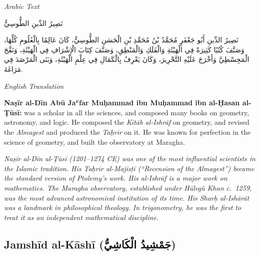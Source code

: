 \documentclass[11pt,a4paper]{article}
\def\RL#1{\beginR#1\endR}
\newcommand{\cnote}[1]{\textcolor{notecolor}{\textit{#1}}}
\newcommand{\textarabic}[1]{{\arabicfont\RL{#1}}}
\newenvironment{arabiccol}{%
  \begin{minipage}[t]{0.48\textwidth}%
  \begin{tcolorbox}[colback=leftbg,colframe=rulecolor,boxrule=0.4pt,arc=2pt,left=5pt,right=5pt,top=5pt,bottom=5pt]%
  \centering\textit{\footnotesize Arabic Text}\\[0.4em]%
  \raggedright\arabicfont\small%
}{%
  \end{tcolorbox}%
  \end{minipage}%
}
\newenvironment{englishcol}{%
  \begin{minipage}[t]{0.48\textwidth}%
  \begin{tcolorbox}[colback=rightbg,colframe=rulecolor,boxrule=0.4pt,arc=2pt,left=5pt,right=5pt,top=5pt,bottom=5pt]%
  \centering\textit{\footnotesize English Translation}\\[0.4em]%
  \raggedright\small%
}{%
  \end{tcolorbox}%
  \end{minipage}%
}
\begin{document}
\noindent
\begin{arabiccol}
\beginR
نَصِيرُ الدِّينِ الطُّوسِيُّ

نَصِيرُ الدِّينِ أَبُو جَعْفَرٍ مُحَمَّدُ بْنُ مُحَمَّدِ بْنِ الْحَسَنِ الطُّوسِيُّ، كَانَ عَالِمًا بِالْعُلُومِ كُلِّهَا، وَصَنَّفَ كُتُبًا كَثِيرَةً فِي الْهَيْئَةِ وَالْفَلَكِ وَالْمَنْطِقِ، وَصَنَّفَ كِتَابَ الْإِشْرَافِ فِي الْهَيْئَةِ، وَنَقَّحَ الْمَجِسْطِيَّ وَأَخْرَجَ عَلَيْهِ التَّحْرِيرَ، وَكَانَ يَعْرِفُ بِالْكَمَالِ فِي عِلْمِ الْهَيْئَةِ، وَبَنَى الْمَرْصَدَ فِي مَرَاغَةَ.
\endR
\end{arabiccol}
\hfill
\begin{englishcol}
\textbf{Naṣīr al-Dīn Abū Jaʿfar Muḥammad ibn Muḥammad ibn al-Ḥasan al-Ṭūsī:} was a scholar in all the sciences, and composed many books on geometry, astronomy, and logic. He composed the \textit{Kitāb al-Ishrāf} on geometry, and revised the \textit{Almagest} and produced the \textit{Taḥrīr} on it. He was known for perfection in the science of geometry, and built the observatory at Maragha.

\cnote{Naṣīr al-Dīn al-Ṭūsī (1201--1274 CE) was one of the most influential scientists in the Islamic tradition. His \textit{Taḥrīr al-Majisṭī} (``Recension of the Almagest'') became the standard version of Ptolemy's work. His \textit{al-Ishrāf} is a major work on mathematics. The Maragha observatory, established under Hülegü Khan c.~1259, was the most advanced astronomical institution of its time. His \textit{Sharḥ al-Ishārāt} was a landmark in philosophical theology. In trigonometry, he was the first to treat it as an independent mathematical discipline.}
\end{englishcol}

\par\vspace{0.5em}

\subsection{Jamshīd al-Kāshī (\textarabic{جَمْشِيدُ الْكَاشِيُّ})}
\end{document}
